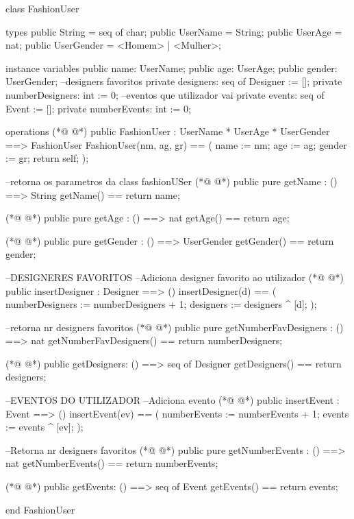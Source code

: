 \begin{vdmpp}[breaklines=true]
class FashionUser

types
 public String = seq of char;
 public UserName = String;
 public UserAge = nat;
 public UserGender = <Homem> | <Mulher>;
 
instance variables
 public name: UserName;
 public age: UserAge;
 public gender: UserGender;
 --designers favoritos
 private  designers: seq of Designer := [];
 private  numberDesigners: int := 0;
 --eventos que utilizador vai
  private events: seq of Event := [];
 private  numberEvents: int := 0;

operations  
(*@
\label{FashionUser:21}
@*)
  public FashionUser : 
            UserName *
            UserAge *
            UserGender ==> FashionUser
  FashionUser(nm, ag, gr) ==
  (
    name := nm;
    age := ag;
    gender := gr;
    return self;
  );
  
  --retorna os parametros da class fashionUSer
(*@
\label{getName:34}
@*)
  public pure getName : () ==> String
    getName() == return name;
    
(*@
\label{getAge:37}
@*)
   public pure getAge : () ==> nat
     getAge() == return age;
     
(*@
\label{getGender:40}
@*)
  public pure getGender : () ==> UserGender
     getGender() == return gender;
  
   
    --DESIGNERES FAVORITOS  
   --Adiciona designer favorito ao utilizador
(*@
\label{insertDesigner:46}
@*)
  public insertDesigner : Designer ==> ()
   insertDesigner(d) ==
   (
     numberDesigners := numberDesigners + 1;
     designers := designers ^ [d];
   );
   
  --retorna nr designers favoritos
(*@
\label{getNumberFavDesigners:54}
@*)
   public pure getNumberFavDesigners : () ==> nat
   getNumberFavDesigners() == return numberDesigners;
   
(*@
\label{getDesigners:57}
@*)
   public getDesigners: () ==> seq of Designer
   getDesigners() == return designers;
   
    --EVENTOS DO UTILIZADOR
    --Adiciona evento
(*@
\label{insertEvent:62}
@*)
  public insertEvent : Event ==> ()
   insertEvent(ev) ==
   (
     numberEvents := numberEvents + 1;
     events := events ^ [ev];
   );
   
  --Retorna nr designers favoritos
(*@
\label{getNumberEvents:70}
@*)
   public pure getNumberEvents : () ==> nat
   getNumberEvents() == return numberEvents;

(*@
\label{getEvents:73}
@*)
  public getEvents: () ==> seq of Event
   getEvents() == return events;

end FashionUser
\end{vdmpp}
